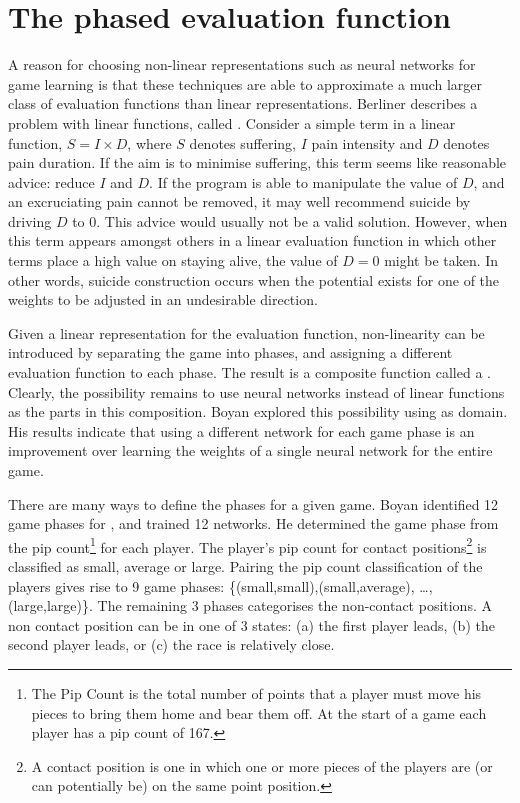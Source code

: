 \section{The phased evaluation function}
\label{sec:learning-phased-function}
A reason for choosing non-linear representations such as neural networks for game learning is that these techniques are able to  approximate a much larger class of evaluation functions than linear representations. Berliner \cite{berliner:beats} describes a problem with linear functions, called . Consider a simple term in a linear function, $S = I \times D$, where $S$ denotes suffering, $I$  pain intensity and $D$ denotes pain duration.  If the aim is to minimise suffering, this term seems like reasonable advice: reduce $I$ and  $D$. If the program is able to manipulate the value of $D$, and an excruciating pain cannot be removed, it may well recommend suicide by driving $D$ to $0$.  This advice would usually not be a valid solution.  However, when this term appears amongst others in a linear evaluation function in which other terms place a high value on staying alive, the value of $D = 0$ might be taken.  In other words, suicide construction occurs when the potential exists for one of the weights to be adjusted in an undesirable direction.

Given a linear representation for the evaluation function, non-linearity can be introduced by separating the game into phases, and assigning a different evaluation function to each phase. The result is a composite function called a .  Clearly, the possibility remains to use  neural networks instead of linear functions as the parts in this composition. Boyan \cite{boyan:masters-thesis} explored this possibility using  as domain. His results indicate that using a different network for each game phase is an improvement over learning the weights of a single neural network for the entire game. 

There are many ways to define the phases for a given game. Boyan identified 12 game phases for , and trained 12 networks.  He determined the game phase from the pip count\footnote{The Pip Count is the total number of points that a player must move his pieces to bring them home and bear them off. At the start of a game each player has a pip count of 167.} for each player. The player's pip count for contact positions\footnote{A contact position is one in which one or more pieces of the players are (or can potentially be) on the same point position.}  is classified as small, average or large.  Pairing the pip count classification of the players gives rise to 9 game phases: \{(small,small),(small,average), \ldots , (large,large)\}.  The remaining 3 phases categorises the non-contact positions.  A non contact position can be in one of 3 states: (a) the first player leads, (b) the second player leads, or (c) the race is relatively close.  


